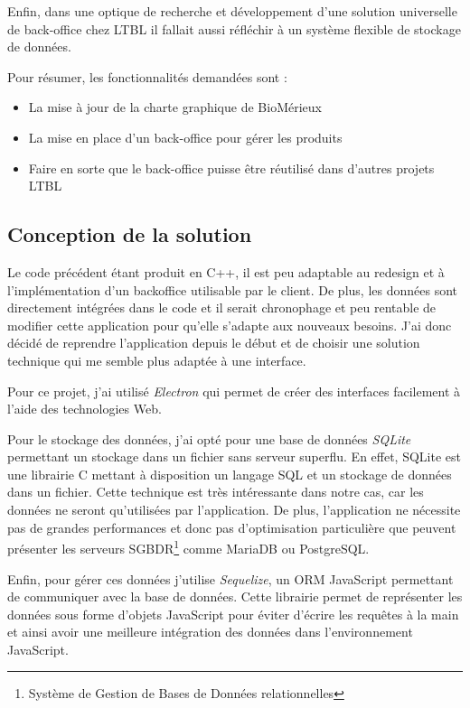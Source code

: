 Enfin, dans une optique de recherche et développement d'une solution universelle de back-office chez LTBL il fallait aussi réfléchir à un système flexible de stockage de données.

\clearpage

Pour résumer, les fonctionnalités demandées sont :

\begin{itemize}
    \item La mise à jour de la charte graphique de BioMérieux
    \item La mise en place d'un back-office pour gérer les produits
    \item Faire en sorte que le back-office puisse être réutilisé dans d'autres projets LTBL
\end{itemize}


\subsection{Conception de la solution}

Le code précédent étant produit en C++, il est peu adaptable au redesign et à l'implémentation d'un backoffice utilisable par le client.
De plus, les données sont directement intégrées dans le code et il serait chronophage et peu rentable de modifier cette application pour qu'elle s'adapte aux nouveaux besoins.
J'ai donc décidé de reprendre l'application depuis le début et de choisir une solution technique qui me semble plus adaptée à une interface.

Pour ce projet, j'ai utilisé \emph{Electron} qui permet de créer des interfaces facilement à l'aide des technologies Web.

Pour le stockage des données, j'ai opté pour une base de données \emph{SQLite} permettant un stockage dans un fichier sans serveur superflu.
En effet, SQLite est une librairie C mettant à disposition un langage SQL et un stockage de données dans un fichier.
Cette technique est très intéressante dans notre cas, car les données ne seront qu'utilisées par l'application.
De plus, l'application ne nécessite pas de grandes performances et donc pas d'optimisation particulière que peuvent présenter les serveurs SGBDR\footnote{Système de Gestion de Bases de Données relationnelles} comme MariaDB ou PostgreSQL\@.

Enfin, pour gérer ces données j'utilise \emph{Sequelize}, un ORM JavaScript permettant de communiquer avec la base de données.
Cette librairie permet de représenter les données sous forme d'objets JavaScript pour éviter d'écrire les requêtes à la main et ainsi avoir une meilleure intégration des données dans l'environnement JavaScript.

